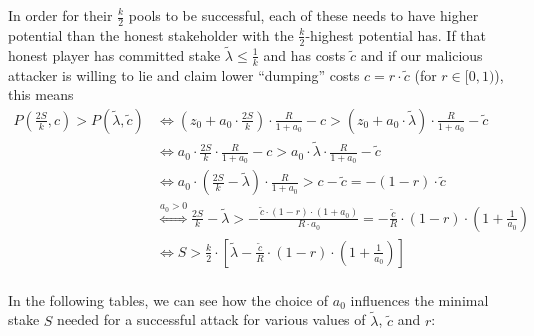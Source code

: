 \documentclass[11pt,a4paper,dvipsnames,twosided]{article}
\begin{document}
In order for their \(\frac{k}{2}\) pools to be successful, each of these
needs to have higher potential than the honest stakeholder with the
\(\frac{k}{2}\)-highest potential has. If that honest player has
committed stake \(\tilde{\lambda}\leq\frac{1}{k}\) and has costs
\(\tilde{c}\) and if our malicious attacker is willing to lie and claim
lower ``dumping'' costs \(c=r\cdot\tilde{c}\) (for \(r\in[0,1)\)), this
means \[
\begin{split}
    P\left(\frac{2S}{k}, c\right) > P(\tilde{\lambda}, \tilde{c})
    &\Longleftrightarrow
    \left(z_0+a_0\cdot\frac{2S}{k}\right)\cdot\frac{R}{1+a_0}-c > \left(z_0+a_0\cdot\tilde{\lambda}\right)\cdot\frac{R}{1+a_0}-\tilde{c} \\
    &\Longleftrightarrow
    a_0\cdot\frac{2S}{k}\cdot\frac{R}{1+a_0}-c > a_0\cdot\tilde{\lambda}\cdot\frac{R}{1+a_0}-\tilde{c} \\
    &\Longleftrightarrow
    a_0\cdot\left(\frac{2S}{k}-\tilde{\lambda}\right)\cdot\frac{R}{1+a_0} > c-\tilde{c}=-(1-r)\cdot\tilde{c} \\
    &\stackrel{a_0>0}{\Longleftrightarrow}
    \frac{2S}{k}-\tilde{\lambda} > -\frac{\tilde{c}\cdot(1-r)\cdot(1+a_0)}{R\cdot a_0} =
    -\frac{\tilde{c}}{R}\cdot(1-r)\cdot\left(1 + \frac{1}{a_0}\right) \\
    &\Longleftrightarrow
    S > \frac{k}{2}\cdot\left[\tilde{\lambda}-\frac{\tilde{c}}{R}\cdot(1-r)\cdot\left(1+\frac{1}{a_0}\right)\right] \\
\end{split}
\]

In the following tables, we can see how the choice of \(a_0\) influences
the minimal stake \(S\) needed for a successful attack for various
values of \(\tilde{\lambda}\), \(\tilde{c}\) and \(r\):
\end{document}
